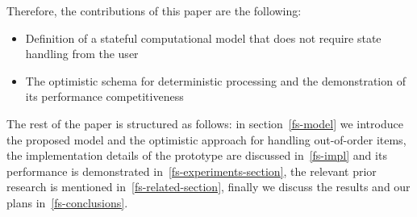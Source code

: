 Therefore, the contributions of this paper are the following:

\begin {itemize}
  \item Definition of a stateful computational model that does not require state handling from the user
  \item The optimistic schema for deterministic processing and the demonstration of its performance competitiveness
\end {itemize}

The rest of the paper is structured as follows: in section~\ref{fs-model} we introduce the proposed model and the optimistic approach for handling out-of-order items, the implementation details of the prototype are discussed in~\ref{fs-impl} and its performance is demonstrated in~\ref{fs-experiments-section}, the relevant prior research is mentioned in~\ref{fs-related-section}, finally we discuss the results and our plans in~\ref{fs-conclusions}.

\endinput
